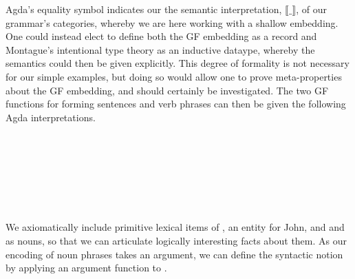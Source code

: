 Agda's equality symbol indicates our the semantic interpretation,
$\llbracket\_\rrbracket$, of our grammar's categories, whereby we are here
working with a shallow embedding. One could instead elect to define both the GF
embedding as a record and Montague's intentional type theory as an inductive
dataype, whereby the semantics could then be given explicitly. This degree of
formality is not necessary for our simple examples, but doing so would allow one
to prove meta-properties about the GF embedding, and should certainly be
investigated. The two GF functions for forming sentences and verb phrases can
then be given the following Agda interpretations.

\begin{code}%
\>[0]\AgdaSpace{}%
\AgdaSymbol{:}\AgdaSpace{}%
\AgdaSpace{}%
\AgdaSpace{}%
\AgdaSpace{}%
\AgdaSpace{}%
\<%
\\
\>[0]\AgdaSpace{}%
\AgdaSpace{}%
\AgdaSpace{}%
\AgdaSymbol{=}\AgdaSpace{}%
\AgdaSpace{}%
\<%
\\
%
\\[\AgdaEmptyExtraSkip]%
\>[0]\AgdaSpace{}%
\AgdaSymbol{:}\AgdaSpace{}%
\AgdaSpace{}%
\AgdaSpace{}%
\AgdaSpace{}%
\AgdaSpace{}%
\<%
\\
\>[0]\AgdaSpace{}%
\AgdaSpace{}%
\AgdaSpace{}%
\AgdaSpace{}%
\AgdaSymbol{=}\AgdaSpace{}%
\AgdaSpace{}%
\AgdaSpace{}%
\<%
\end{code}

\begin{code}[hide]%
\>[0]\AgdaSpace{}%
\AgdaSymbol{:}\AgdaSpace{}%
\AgdaSpace{}%
\AgdaSpace{}%
\AgdaSpace{}%
\AgdaSpace{}%
\<%
\\
\>[0]\AgdaSpace{}%
\AgdaSpace{}%
\AgdaSpace{}%
\AgdaSymbol{=}\AgdaSpace{}%
\AgdaSpace{}%
\<%
\end{code}

We axiomatically include primitive lexical items of , an entity
 for John, and  and  as nouns, so that we can
articulate logically interesting facts about them. As our encoding of noun
phrases takes an argument, we can define the syntactic notion  by
applying an argument function to .

